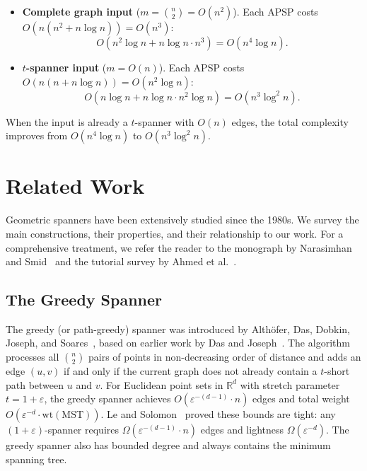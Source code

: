 \documentclass{article}
\begin{document}
\begin{itemize}
    \item \textbf{Complete graph input} ($m = \binom{n}{2} = O(n^2)$).
    Each APSP costs $O(n(n^2 + n \log n)) = O(n^3)$:
    \[
        O(n^2 \log n + n \log n \cdot n^3) = O(n^4 \log n).
    \]

    \item \textbf{$t$-spanner input} ($m = O(n)$).
    Each APSP costs $O(n(n + n \log n)) = O(n^2 \log n)$:
    \[
        O(n \log n + n \log n \cdot n^2 \log n) = O(n^3 \log^2 n).
    \]
\end{itemize}

\noindent When the input is already a $t$-spanner with $O(n)$ edges, the total complexity improves from $O(n^4 \log n)$ to $O(n^3 \log^2 n)$.


\section{Related Work}

Geometric spanners have been extensively studied since the 1980s. We survey the main constructions, their properties, and their relationship to our work. For a comprehensive treatment, we refer the reader to the monograph by Narasimhan and Smid~\cite{narasimhan2007geometric} and the tutorial survey by Ahmed et al.~\cite{ahmed2020graph}.

\subsection{The Greedy Spanner}

The greedy (or path-greedy) spanner was introduced by Alth\"ofer, Das, Dobkin, Joseph, and Soares~\cite{althofer1993sparse}, based on earlier work by Das and Joseph~\cite{das1989which}. The algorithm processes all $\binom{n}{2}$ pairs of points in non-decreasing order of distance and adds an edge $(u,v)$ if and only if the current graph does not already contain a $t$-short path between $u$ and $v$. For Euclidean point sets in $\mathbb{R}^d$ with stretch parameter $t = 1 + \varepsilon$, the greedy spanner achieves $O(\varepsilon^{-(d-1)} \cdot n)$ edges and total weight $O(\varepsilon^{-d} \cdot \mathrm{wt}(\mathrm{MST}))$. Le and Solomon~\cite{le2019truly} proved these bounds are tight: any $(1+\varepsilon)$-spanner requires $\Omega(\varepsilon^{-(d-1)} \cdot n)$ edges and lightness $\Omega(\varepsilon^{-d})$. The greedy spanner also has bounded degree and always contains the minimum spanning tree.
\end{document}
